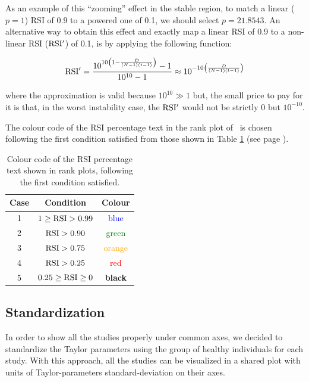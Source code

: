 As an example of this ``zooming'' effect in the stable region, to match a linear ($p=1$) RSI of 0.9 to a powered one of 0.1, we should select $p=21.8543$. An alternative way to obtain this effect and exactly map a linear RSI of 0.9 to a non-linear RSI (${\rm RSI'}$) of 0.1, is by applying the following function:
\begin{linenomath}
$${\rm RSI'} = \frac{10^{10\left(1-\frac{D}{(N-1)(t-1)}\right)}-1}{10^{10}-1} \approx 10^{-10\left(\frac{D}{(N-1)(t-1)}\right)}$$
\end{linenomath}
where the approximation is valid because $10^{10}\gg 1$ but, the small price to pay for it is that, in the worst instability case, the ${\rm RSI'}$ would not be strictly $0$ but $10^{-10}$.

The colour code of the RSI percentage text in the rank plot of \CC\ is chosen following the first condition satisfied from those shown in Table \ref{tab:RSI} (see page \pageref{tab:RSI}). 

\begin{table}
  \begin{center}
    \begin{tabular}{ccc}
    \hline
    Case  &  Condition  &  Colour  \\
    \hline
    1  &  $1\ge{\rm RSI}>0.99$  & \textcolor{blue}{blue}  \\ 
    2  & ${\rm RSI}>0.90$  &  \textcolor{green}{green}  \\
    3  &  ${\rm RSI}>0.75$  &  \textcolor{orange}{orange} \\
    4  &  ${\rm RSI}>0.25$  &  \textcolor{red}{red} \\
    5  &  $0.25\ge{\rm RSI}\ge0$  &  \bfseries{black}  \\
    \hline
    \end{tabular}
  \end{center}
  \caption{Colour code of the RSI percentage text shown in rank plots, following the first condition satisfied.}
  \label{tab:RSI}
\end{table}


\subsection*{Standardization} \label{sec:stan}
In order to show all the studies properly under common axes, we decided to standardize the Taylor parameters using the group of healthy individuals for each study. With this approach, all the studies can be visualized in a shared plot with units of Taylor-parameters standard-deviation on their axes.

